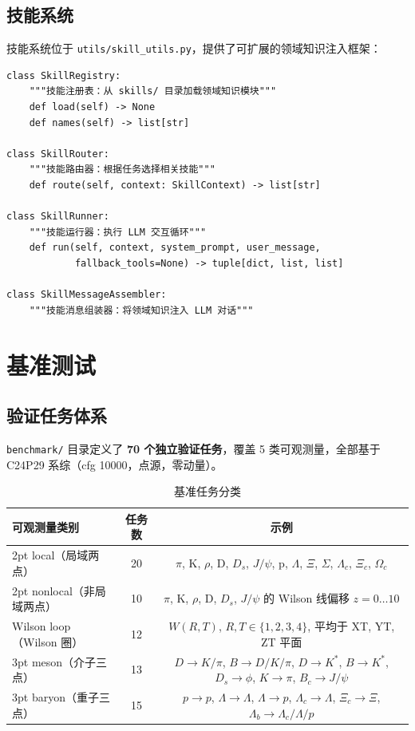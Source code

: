 \documentclass[12pt,a4paper]{ctexart}
\begin{document}
\subsection{技能系统}

\label{sec:skills}

技能系统位于 \texttt{utils/skill\_utils.py}，提供了可扩展的领域知识注入框架：

\begin{lstlisting}[style=pycode]
class SkillRegistry:
    """技能注册表：从 skills/ 目录加载领域知识模块"""
    def load(self) -> None
    def names(self) -> list[str]

class SkillRouter:
    """技能路由器：根据任务选择相关技能"""
    def route(self, context: SkillContext) -> list[str]

class SkillRunner:
    """技能运行器：执行 LLM 交互循环"""
    def run(self, context, system_prompt, user_message,
            fallback_tools=None) -> tuple[dict, list, list]

class SkillMessageAssembler:
    """技能消息组装器：将领域知识注入 LLM 对话"""
\end{lstlisting}

\section{基准测试}

\subsection{验证任务体系}

\texttt{benchmark/} 目录定义了 \textbf{70 个独立验证任务}，覆盖 5 类可观测量，全部基于 C24P29 系综（cfg 10000，点源，零动量）。

\begin{table}[h]
\centering
\begin{tabular}{@{}lcc@{}}
\toprule
\textbf{可观测量类别} & \textbf{任务数} & \textbf{示例} \\
\midrule
2pt local（局域两点）     & 20 & $\pi$, K, $\rho$, D, $D_s$, $J/\psi$, p, $\Lambda$, $\Xi$, $\Sigma$, $\Lambda_c$, $\Xi_c$, $\Omega_c$ \\
2pt nonlocal（非局域两点）& 10 & $\pi$, K, $\rho$, D, $D_s$, $J/\psi$ 的 Wilson 线偏移 $z = 0\ldots10$ \\
Wilson loop（Wilson 圈） & 12 & $W(R,T)$, $R,T\in\{1,2,3,4\}$, 平均于 XT, YT, ZT 平面 \\
3pt meson（介子三点）    & 13 & $D\to K/\pi$, $B\to D/K/\pi$, $D\to K^*$, $B\to K^*$, $D_s\to\phi$, $K\to\pi$, $B_c\to J/\psi$ \\
3pt baryon（重子三点）   & 15 & $p\to p$, $\Lambda\to\Lambda$, $\Lambda\to p$, $\Lambda_c\to\Lambda$, $\Xi_c\to\Xi$, $\Lambda_b\to\Lambda_c/\Lambda/p$ \\
\bottomrule
\end{tabular}
\caption{基准任务分类}
\end{table}
\end{document}
